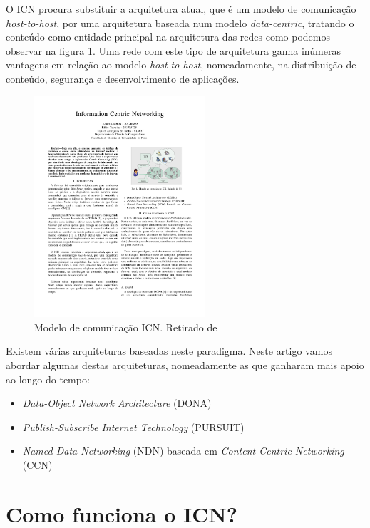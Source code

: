 \documentclass[conference]{IEEEtran}
\begin{document}
O ICN procura substituir a arquitetura atual, que \'{e} um modelo de comunica\c{c}\~{a}o \textit{host-to-host}, por uma arquitetura baseada num modelo \textit{data-centric}, tratando o conte\'{u}do como entidade principal na arquitetura das redes como podemos observar na figura \ref{icn}. Uma rede com este tipo de arquitetura ganha in\'{u}meras vantagens em rela\c{c}\~{a}o ao modelo \textit{host-to-host}, nomeadamente, na distribui\c{c}\~{a}o de conte\'{u}do, seguran\c{c}a e desenvolvimento de aplica\c{c}\~{o}es\cite{icn}.\\

\begin{figure}[!t]
\centering
\includegraphics[width=2.5in]{icn}
\caption{Modelo de comunica\c{c}\~{a}o ICN. Retirado de \cite{ahlgren}}
\label{icn}
\end{figure}

Existem v\'{a}rias arquiteturas baseadas neste paradigma. Neste artigo vamos abordar algumas destas arquiteturas, nomeadamente as que ganharam mais apoio ao longo do tempo: \\

\begin{itemize}
\item \textit{Data-Object Network Architecture} (DONA)
\item \textit{Publish-Subscribe Internet Technology} (PURSUIT)
\item \textit{Named Data Networking} (NDN) baseada em \textit{Content-Centric Networking} (CCN) 
\end{itemize}



\section{Como funciona o ICN?}
\end{document}
